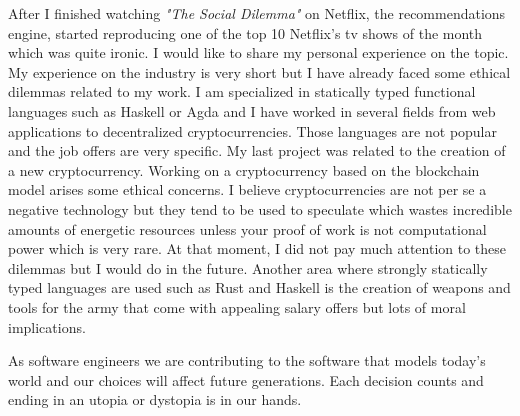 \documentclass[12pt, a4paper]{article}
\begin{document}
After I finished watching \textit{"The Social Dilemma"} on Netflix, the recommendations engine, started reproducing one of the top 10 Netflix's tv shows of the month which was quite ironic. I would like to share my personal experience on the topic. My experience on the industry is very short but I have already faced some ethical dilemmas related to my work. I am specialized in statically typed functional languages such as Haskell or Agda and I have worked in several fields from web applications to decentralized cryptocurrencies. Those languages are not popular and the job offers are very specific. My last project was related to the creation of a new cryptocurrency. Working on a cryptocurrency based on the blockchain model arises some ethical concerns. I believe cryptocurrencies are not per se a negative technology but they tend to be used to speculate which wastes incredible amounts of energetic resources unless your proof of work is not computational power which is very rare. At that moment, I did not pay much attention to these dilemmas but I would do in the future. Another area where strongly statically typed languages are used such as Rust and Haskell is the creation of weapons and tools for the army that come with appealing salary offers but lots of moral implications.

As software engineers we are contributing to the software that models today's world and our choices will affect future generations. Each decision counts and ending in an utopia or dystopia is in our hands.
\end{document}

